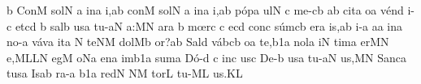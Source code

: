 \initiumgregorianum
\znotes\fissum{1pt}\bmolle b\en
%
\sgn Con\punctum M\egn
\sgn so{l}\punctum N\egn
{}\punctum a\egn
\sgn {}i{n}\punctum a\egn
\sgn {}i,\punctum a\augmentum b\egn
\spatium
\begingroup
\bgenerale
\sgn con\punctum M\egn
\sgn so{l}\punctum N\egn
{}\punctum a\egn
\sgn {}i{n}\punctum a\egn
\sgn {}i,\punctum a\augmentum b\egn
\spatium
\sgn p{\'o}{p}\punctum a\egn
\sgn {}u{l}\punctum N\egn
{}\punctum c\egn
\spatium
\sgn m{e}{-}\clivis cb\egn
{}\punctum a\augmentum b\egn
\spatium
\divisiominor
\spatium
\sgn c{i}{t}\punctum a\egn
\sgn {}o{}\punctum a\egn
\spatium
\sgn v{\'e}{n}\punctum d\egn
\sgn {}i{-}\punctum c\egn
\sgn {}et\punctum c\augmentum d\egn
\spatium
\custos b
\lineaproxima
\sgn s{a}{l}\punctum b\egn
\sgn {}us\punctum a\egn
\spatium
\sgn t{u}{-}\clivis aN\egn
\sgn {}a:\punctum M\augmentum N\egn
\spatium
\divisiomaior
\spatium
{}a{r}\punctum a\egn
{}\punctum b\egn
\spatium
\sgn m{\oe}{r}\punctum c\egn
{}\punctum c\egn
\sgn {}e{}\pes cd\egn
\spatium
\sgn con\punctum c\egn
\sgn s{\'u}{m}\clivis cb\egn
\sgn {}e{r}\punctum a\egn
\sgn {}i{s,}\punctum a\augmentum b\egn
\spatium
\divisiominor
\spatium
{}i{-}\punctum a\egn
\sgn {}a{}\punctum a\egn
\spatium
\sgn {}in\punctum a\egn
\sgn no{-}\punctum a\egn
\sgn v{\'a}{v}\punctum a\egn
\sgn {}it\punctum a\egn
\spatium
\custos N
\lineaproxima
\sgn t{e}{}\clivis NM\egn
\spatium
\sgn d{o}{l}\pes Mb\egn
\sgn {}o{r?}\punctum a\augmentum b\egn
\spatium
\divisiomaior
\spatium
\sgn Sal\punctum d\egn
\sgn v{\'a}{b}\clivis cb\egn
\sgn {}o{}\engl{}\punctum a\egn
\spatium
\sgn te{,}\episem b1\punctum a\egn
\spatium
\divisiominima
\spatium
\sgn no{l}\punctum a\egn
\sgn {}i{}\punctum N\egn
\spatium
\sgn ti{m}\punctum a\egn
\sgn {}e{r}\pes MN\egn
\sgn {}e{,}\clivis ML\augmentumduplex LN\egn
\spatium
\divisiomaior
\spatium
\sgn {}e{g}\punctum M\egn
\sgn {}o{}\pes Na\egn
\spatium
\sgn {}e{n}\punctum a\egn
\sgn {}im\episem b1\punctum a\egn
\spatium
\sgn sum\punctum a\egn
\spatium
\sgn D{\'o}{-}\punctum d\egn
\custos c
\lineaproxima
{}i{n}\punctum c\egn
\sgn {}us\punctum c\egn
\spatium
\sgn De{-}\punctum b\egn
\sgn {}us\punctum a\egn
\spatium
\sgn t{u}{-}\clivis aN\egn
\sgn {}u{s,}\punctum M\augmentum N\egn
\spatium
\divisiominor
\spatium
\sgn Sa{nc}\punctum a\egn
\sgn tus\punctum a\egn
\spatium
\sgn {}Is\pes ab\egn
\sgn ra{-}\punctum a\egn
{}\episem b1\punctum a\egn
\spatium
\sgn re{d}\punctum N\egn
{}\clivis NM\egn
\sgn tor\punctum L\egn
\spatium
\sgn t{u}{-}\clivis ML\egn
\sgn {}u{s.}\punctum K\augmentum L\egn
\endgroup
\Finisgregoriana


